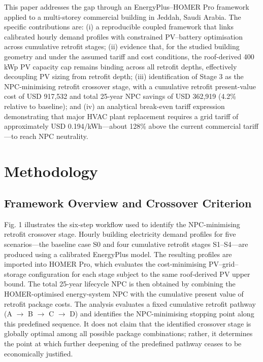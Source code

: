 \documentclass[journal,fleqn]{IEEEtran}
\begin{document}
This paper addresses the gap through an EnergyPlus--HOMER Pro framework applied to a multi-storey commercial building in Jeddah, Saudi Arabia. The specific contributions are: (i) a reproducible coupled framework that links calibrated hourly demand profiles with constrained PV--battery optimisation across cumulative retrofit stages; (ii) evidence that, for the studied building geometry and under the assumed tariff and cost conditions, the roof-derived 400 kWp PV capacity cap remains binding across all retrofit depths, effectively decoupling PV sizing from retrofit depth; (iii) identification of Stage 3 as the NPC-minimising retrofit crossover stage, with a cumulative retrofit present-value cost of USD 917,532 and total 25-year NPC savings of USD 362,919 (4.2\% relative to baseline); and (iv) an analytical break-even tariff expression demonstrating that major HVAC plant replacement requires a grid tariff of approximately USD 0.194/kWh---about 128\% above the current commercial tariff---to reach NPC neutrality.


\section{Methodology}

\subsection{Framework Overview and Crossover Criterion}

Fig. 1 illustrates the six-step workflow used to identify the NPC-minimising retrofit crossover stage. Hourly building electricity demand profiles for five scenarios---the baseline case S0 and four cumulative retrofit stages S1--S4---are produced using a calibrated EnergyPlus model. The resulting profiles are imported into HOMER Pro, which evaluates the cost-minimising PV--grid--storage configuration for each stage subject to the same roof-derived PV upper bound. The total 25-year lifecycle NPC is then obtained by combining the HOMER-optimised energy-system NPC with the cumulative present value of retrofit package costs. The analysis evaluates a fixed cumulative retrofit pathway (A $\rightarrow$ B $\rightarrow$ C $\rightarrow$ D) and identifies the NPC-minimising stopping point along this predefined sequence. It does not claim that the identified crossover stage is globally optimal among all possible package combinations; rather, it determines the point at which further deepening of the predefined pathway ceases to be economically justified.
\end{document}
